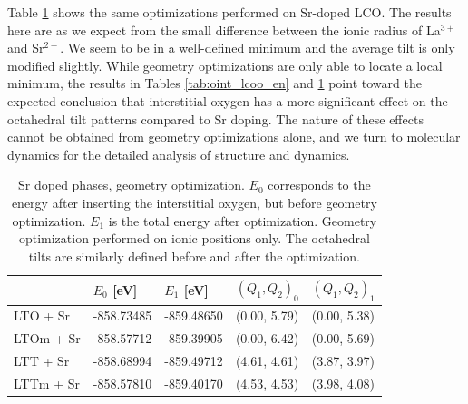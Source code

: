 Table \ref{tab:oint_lsco_en} shows the same optimizations performed on Sr-doped LCO. The results here are as we expect from the small difference between the ionic radius of La$^{3+}$ and Sr$^{2+}$. We seem to be in a well-defined minimum and the average tilt is only modified slightly. While geometry optimizations are only able to locate a local minimum, the results in Tables \ref{tab:oint_lcoo_en} and \ref{tab:oint_lsco_en} point toward the expected conclusion that interstitial oxygen has a more significant effect on the octahedral tilt patterns compared to Sr doping. The nature of these effects cannot be obtained from geometry optimizations alone, and we turn to molecular dynamics for the detailed analysis of structure and dynamics.

\begin{table}[b]
	\centering
	\caption[Sr doped phases: Energy]{Sr doped phases, geometry optimization. $E_0$ corresponds to the energy after inserting the interstitial oxygen, but before geometry optimization. $E_1$ is the total energy after optimization. Geometry optimization performed on ionic positions only. The octahedral tilts are similarly defined before and after the optimization.}
	\label{tab:oint_lsco_en}
	\begin{tabular}{@{}lllll@{}}
    \toprule
	 & $E_0$ [eV] & $E_1$ [eV] & $(Q_1, Q_2)_0$ & $(Q_1, Q_2)_1$  \\ 
	\midrule
    LTO + Sr                  & -858.73485             & -859.48650  & (0.00, 5.79) & (0.00, 5.38) \\
	LTOm + Sr                    & -858.57712             & -859.39905  & (0.00, 6.42) & (0.00, 5.69) \\
	LTT + Sr                    & -858.68994            & -859.49712  & (4.61, 4.61) & (3.87, 3.97) \\
	LTTm + Sr                    & -858.57810           & -859.40170  & (4.53, 4.53) & (3.98, 4.08) \\
	\bottomrule
    \end{tabular}
\end{table}

